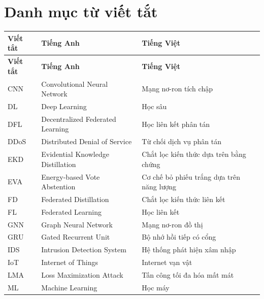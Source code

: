
\chapter*{Danh mục từ viết tắt}

\small
\begin{longtable}{p{2.8cm} p{3.5cm} p{6.5cm}}
\hline
\textbf{Viết tắt} & \textbf{Tiếng Anh} & \textbf{Tiếng Việt} \\
\hline
\endfirsthead
\hline
\textbf{Viết tắt} & \textbf{Tiếng Anh} & \textbf{Tiếng Việt} \\
\hline
\endhead
\hline
\endfoot
\hline
\endlastfoot
CNN & Convolutional Neural Network & Mạng nơ-ron tích chập \\
DL & Deep Learning & Học sâu \\
DFL & Decentralized Federated Learning & Học liên kết phân tán \\
DDoS & Distributed Denial of Service & Từ chối dịch vụ phân tán \\
EKD & Evidential Knowledge Distillation & Chắt lọc kiến thức dựa trên bằng chứng \\
EVA & Energy-based Vote Abstention & Cơ chế bỏ phiếu trắng dựa trên năng lượng \\
FD & Federated Distillation & Chắt lọc kiến thức liên kết \\
FL & Federated Learning & Học liên kết \\
GNN & Graph Neural Network & Mạng nơ-ron đồ thị \\
GRU & Gated Recurrent Unit & Bộ nhớ hồi tiếp có cổng \\
IDS & Intrusion Detection System & Hệ thống phát hiện xâm nhập \\
IoT & Internet of Things & Internet vạn vật \\
LMA & Loss Maximization Attack & Tấn công tối đa hóa mất mát \\
ML & Machine Learning & Học máy \\
\end{longtable}

\pagebreak
